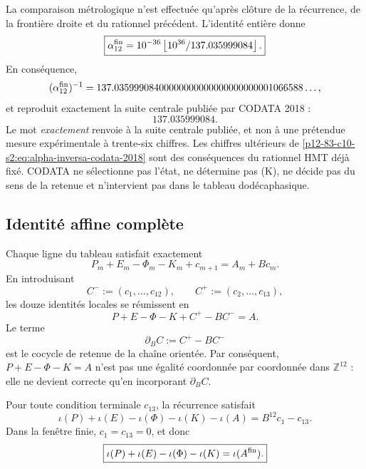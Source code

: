 La comparaison métrologique n’est effectuée qu’après clôture de la récurrence,
de la frontière droite et du rationnel précédent. L’identité entière donne
\begin{equation}
 \boxed{
 \alpha_{12}^{\rm fin}
 =10^{-36}
 \left\lfloor\frac{10^{36}}{137.035999084}\right\rfloor.}
 \label{p12-83-c10-s2:eq:alpha-finita-codata-2018}
\end{equation}
En conséquence,
\begin{equation}
 (\alpha_{12}^{\rm fin})^{-1}
 =137.03599908400000000000000000000001066588\ldots,
 \label{p12-83-c10-s2:eq:alpha-inversa-codata-2018}
\end{equation}
et reproduit exactement la suite centrale publiée par CODATA 2018
\cite{Tiesinga2021CODATA} :
\[
 \boxed{137.035999084.}
\]
Le mot \emph{exactement} renvoie à la suite centrale publiée, et non
à une prétendue mesure expérimentale à trente-six chiffres. Les chiffres
ultérieurs de \eqref{p12-83-c10-s2:eq:alpha-inversa-codata-2018} sont des conséquences du
rationnel HMT déjà fixé. CODATA ne sélectionne pas l’état, ne détermine pas (K),
ne décide pas du sens de la retenue et n’intervient pas dans le tableau dodécaphasique.

\subsection{Identité affine complète}

Chaque ligne du tableau satisfait exactement
\begin{equation}
 P_m+E_m-\Phi_m-K_m+c_{m+1}
 =A_m+Bc_m.
 \label{p12-83-c10-s2:eq:identidad-local-acarreo-alpha}
\end{equation}
En introduisant
\[
 C^-:=(c_1,\ldots,c_{12}),
 \qquad
 C^+:=(c_2,\ldots,c_{13}),
\]
les douze identités locales se réunissent en
\begin{equation}
 \boxed{
 P+E-\Phi-K+C^+-BC^-=A.}
 \label{p12-83-c10-s2:eq:identidad-afin-vectorial-alpha}
\end{equation}
Le terme
\[
 \partial_BC:=C^+-BC^-
\]
est le cocycle de retenue de la chaîne orientée. Par conséquent,
\(P+E-\Phi-K=A\) n’est pas une égalité coordonnée par coordonnée dans
\(\mathbb Z^{12}\) : elle ne devient correcte qu’en incorporant
\(\partial_BC\).

\begin{theorem}
\label{p12-83-c10-s2:thm:telescopado-acarreos-alpha}
Pour toute condition terminale \(c_{13}\), la récurrence satisfait
\begin{equation}
 \boxed{
 \iota(P)+\iota(E)-\iota(\Phi)-\iota(K)-\iota(A)
 =B^{12}c_1-c_{13}.}
 \label{p12-83-c10-s2:eq:telescopado-general-alpha}
\end{equation}
Dans la fenêtre finie, \(c_1=c_{13}=0\), et donc
\begin{equation}
 \boxed{
 \iota(P)+\iota(E)-\iota(\Phi)-\iota(K)
 =\iota(A^{\rm fin}).}
 \label{p12-83-c10-s2:eq:identidad-entera-alpha-finita}
\end{equation}
\end{theorem}

